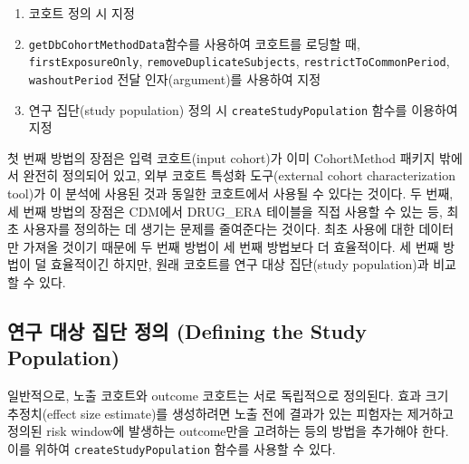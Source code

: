 \documentclass[11pt]{book}
\providecommand{\tightlist}{%
  \setlength{\itemsep}{0pt}\setlength{\parskip}{0pt}}
\theoremstyle{definition}
\theoremstyle{definition}
\theoremstyle{definition}
\theoremstyle{remark}
\begin{document}
\begin{enumerate}
\def\labelenumi{\arabic{enumi}.}
\tightlist
\item
  코호트 정의 시 지정
\item
  \texttt{getDbCohortMethodData}함수를 사용하여 코호트를 로딩할 때,
  \texttt{firstExposureOnly}, \texttt{removeDuplicateSubjects},
  \texttt{restrictToCommonPeriod}, \texttt{washoutPeriod} 전달
  인자(argument)를 사용하여 지정
\item
  연구 집단(study population) 정의 시 \texttt{createStudyPopulation}
  함수를 이용하여 지정
\end{enumerate}

첫 번째 방법의 장점은 입력 코호트(input cohort)가 이미 CohortMethod
패키지 밖에서 완전히 정의되어 있고, 외부 코호트 특성화 도구(external
cohort characterization tool)가 이 분석에 사용된 것과 동일한 코호트에서
사용될 수 있다는 것이다. 두 번째, 세 번째 방법의 장점은 CDM에서
DRUG\_ERA 테이블을 직접 사용할 수 있는 등, 최초 사용자를 정의하는 데
생기는 문제를 줄여준다는 것이다. 최초 사용에 대한 데이터만 가져올 것이기
때문에 두 번째 방법이 세 번째 방법보다 더 효율적이다. 세 번째 방법이 덜
효율적이긴 하지만, 원래 코호트를 연구 대상 집단(study population)과
비교할 수 있다.

\subsection{연구 대상 집단 정의 (Defining the Study
Population)}\label{----defining-the-study-population}

일반적으로, 노출 코호트와 outcome 코호트는 서로 독립적으로 정의된다.
효과 크기 추정치(effect size estimate)를 생성하려면 노출 전에 결과가
있는 피험자는 제거하고 정의된 risk window에 발생하는 outcome만을
고려하는 등의 방법을 추가해야 한다. 이를 위하여
\texttt{createStudyPopulation} 함수를 사용할 수 있다.
\end{document}

